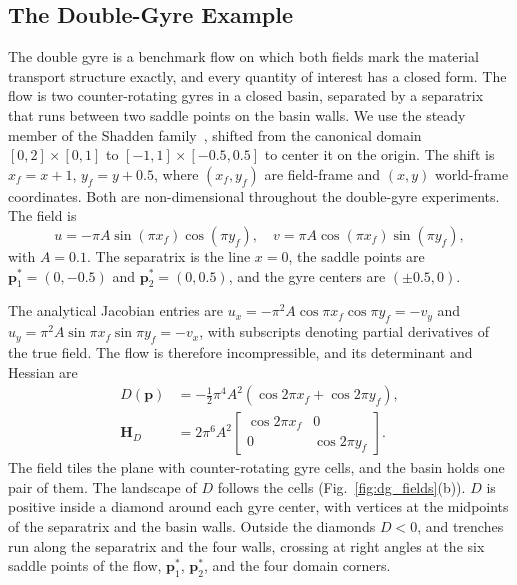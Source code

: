 \documentclass[lettersize,journal]{IEEEtran}
\begin{document}
\subsection{The Double-Gyre Example}
\label{sec:dg_example}

The double gyre is
a benchmark flow on which both fields mark the material transport structure
exactly, and every
quantity of interest has a closed form. The flow is two counter-rotating gyres in a
closed basin, separated by a separatrix that runs between two saddle points on
the basin walls. We use the steady member of the Shadden
family~\cite{17}, shifted from the canonical domain
$[0,2]\times[0,1]$ to $[-1,1]\times[-0.5,0.5]$ to center it on the origin. The
shift is $x_f = x + 1$, $y_f = y + 0.5$, where $(x_f, y_f)$ are field-frame and
$(x, y)$ world-frame coordinates. Both are non-dimensional throughout the
double-gyre experiments. The field is
\begin{equation}
u = -\pi A \sin(\pi x_f)\cos(\pi y_f), \quad
v = \pi A \cos(\pi x_f)\sin(\pi y_f),
\label{eq:dg_u}
\end{equation}
with $A = 0.1$. The separatrix is the line $x = 0$, the saddle points are
$\mathbf{p}_1^* = (0, -0.5)$ and $\mathbf{p}_2^* = (0, 0.5)$, and the gyre
centers are $(\pm 0.5, 0)$.

The analytical Jacobian entries are
$u_x = -\pi^2 A \cos\pi x_f \cos\pi y_f = -v_y$ and
$u_y = \pi^2 A \sin\pi x_f \sin\pi y_f = -v_x$, with subscripts denoting
partial derivatives of the true field. The flow is therefore
incompressible, and its determinant and Hessian are
\begin{equation}
\begin{aligned}
D(\mathbf{p}) &= -\tfrac{1}{2}\pi^4 A^2 \left(\cos 2\pi x_f + \cos 2\pi y_f\right),\\
\mathbf{H}_D &= 2\pi^6 A^2
\begin{bmatrix} \cos 2\pi x_f & 0 \\ 0 & \cos 2\pi y_f \end{bmatrix}.
\end{aligned}
\label{eq:det_analytic_main}
\end{equation}
The field tiles the plane with counter-rotating gyre cells, and the basin
holds one pair of them. The landscape of $D$ follows the cells
(Fig.~\ref{fig:dg_fields}(b)). $D$ is positive inside a diamond around each
gyre center, with vertices at the midpoints of the separatrix and the basin
walls. Outside the diamonds $D < 0$, and trenches run along the separatrix
and the four walls, crossing at right angles at the six saddle points of the
flow, $\mathbf{p}_1^*$, $\mathbf{p}_2^*$, and the four domain corners.
\end{document}
